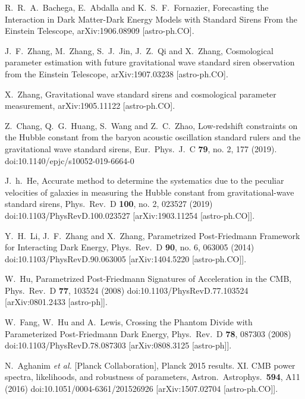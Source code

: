\documentclass[aps,prd,nofootinbib,amsmath,amssymb,superscriptaddress,twocolumn,10pt]{revtex4}%
\begin{document}
\begin{thebibliography}{99}
  R.~R.~A.~Bachega, E.~Abdalla and K.~S.~F.~Fornazier,
  Forecasting the Interaction in Dark Matter-Dark Energy Models with Standard Sirens From the Einstein Telescope,
  arXiv:1906.08909 [astro-ph.CO].

  J.~F.~Zhang, M.~Zhang, S.~J.~Jin, J.~Z.~Qi and X.~Zhang,
  Cosmological parameter estimation with future gravitational wave standard siren observation from the Einstein Telescope,
  arXiv:1907.03238 [astro-ph.CO].

  X.~Zhang,
  Gravitational wave standard sirens and cosmological parameter measurement,
  arXiv:1905.11122 [astro-ph.CO].

  Z.~Chang, Q.~G.~Huang, S.~Wang and Z.~C.~Zhao,
  Low-redshift constraints on the Hubble constant from the baryon acoustic oscillation standard rulers and the gravitational wave standard sirens,
  Eur.\ Phys.\ J.\ C {\bf 79}, no. 2, 177 (2019).
  doi:10.1140/epjc/s10052-019-6664-0


  J.~h.~He,
  Accurate method to determine the systematics due to the peculiar velocities of galaxies in measuring the Hubble constant from gravitational-wave standard sirens,
  Phys.\ Rev.\ D {\bf 100}, no. 2, 023527 (2019)
  doi:10.1103/PhysRevD.100.023527
  [arXiv:1903.11254 [astro-ph.CO]].

  Y.~H.~Li, J.~F.~Zhang and X.~Zhang,
  Parametrized Post-Friedmann Framework for Interacting Dark Energy,
  Phys.\ Rev.\ D {\bf 90}, no. 6, 063005 (2014)
  doi:10.1103/PhysRevD.90.063005
  [arXiv:1404.5220 [astro-ph.CO]].

  W.~Hu,
  Parametrized Post-Friedmann Signatures of Acceleration in the CMB,
  Phys.\ Rev.\ D {\bf 77}, 103524 (2008)
  doi:10.1103/PhysRevD.77.103524
  [arXiv:0801.2433 [astro-ph]].

  W.~Fang, W.~Hu and A.~Lewis,
  Crossing the Phantom Divide with Parameterized Post-Friedmann Dark Energy,
  Phys.\ Rev.\ D {\bf 78}, 087303 (2008)
  doi:10.1103/PhysRevD.78.087303
  [arXiv:0808.3125 [astro-ph]].

  N.~Aghanim {\it et al.} [Planck Collaboration],
  Planck 2015 results. XI. CMB power spectra, likelihoods, and robustness of parameters,
  Astron.\ Astrophys.\  {\bf 594}, A11 (2016)
  doi:10.1051/0004-6361/201526926
  [arXiv:1507.02704 [astro-ph.CO]].


\end{thebibliography}
\end{document}
